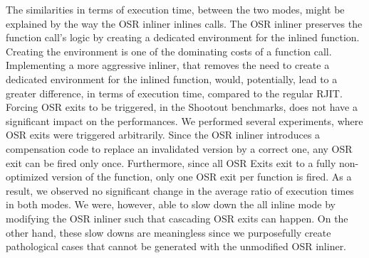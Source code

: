The similarities in terms of execution time, between the two modes, might be explained by the way the OSR inliner inlines calls.
The OSR inliner preserves the function call's logic by creating a dedicated environment for the inlined function.
Creating the environment is one of the dominating costs of a function call.
Implementing a more aggressive inliner, that removes the need to create a dedicated environment for the inlined function, would, potentially, lead to a greater difference, in terms of execution time, compared to the regular RJIT.\\

Forcing OSR exits to be triggered, in the Shootout benchmarks, does not have a significant impact on the performances.
We performed several experiments, where OSR exits were triggered arbitrarily.
Since the OSR inliner introduces a compensation code to replace an invalidated version by a correct one, any OSR exit can be fired only once.
Furthermore, since all OSR Exits exit to a fully non-optimized version of the function, only one OSR exit per function is fired.
As a result, we observed no significant change in the average ratio of execution times in both modes.
We were, however, able to slow down the all inline mode by modifying the OSR inliner such that cascading OSR exits can happen.
On the other hand, these slow downs are meaningless since we purposefully create pathological cases that cannot be generated with the unmodified OSR inliner.\\ 

